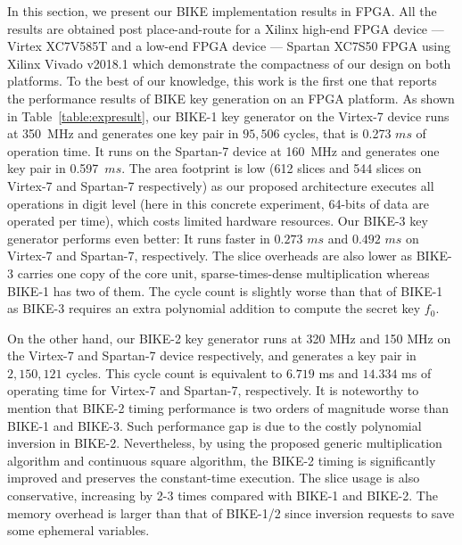 \documentclass[runningheads]{llncs}
\begin{document}
In this section, we present our BIKE implementation results in FPGA. All the results are obtained post place-and-route for a  Xilinx high-end FPGA device --- Virtex XC7V585T  and a low-end FPGA device ---  Spartan XC7S50 FPGA using Xilinx Vivado v2018.1 which demonstrate the compactness of our design on both platforms. To the best of our knowledge, this work is the first one that reports the performance results of BIKE key generation on an FPGA platform. As shown in Table~\ref{table:expresult}, our BIKE-1 key generator on the Virtex-7 device runs at 350~MHz and generates one key pair  in $95,506$ cycles, that is 0.273 $ms$ of operation time. It runs on the Spartan-7 device at 160~MHz and generates one key pair in 0.597~$ms$. The area footprint is low (612 slices and 544 slices on Virtex-7 and Spartan-7 respectively) as our proposed architecture executes all operations  in digit level (here in this concrete experiment, 64-bits of data are operated per time), which costs limited hardware resources. Our BIKE-3 key generator performs even better: It runs faster in $0.273$ $ms$ and $0.492$ $ms$ on Virtex-7 and Spartan-7, respectively. The slice overheads are also lower as BIKE-3 carries one copy of the core unit, sparse-times-dense multiplication whereas BIKE-1 has two of them. The cycle count is slightly worse than that of BIKE-1 as BIKE-3 requires an extra polynomial addition to compute the secret key $f_0$.

On the other hand, our BIKE-2 key generator runs at 320 MHz and 150 MHz on the Virtex-7 and Spartan-7 device respectively, and generates a key pair in $2,150,121$ cycles. This cycle count is equivalent to $6.719$ ms and $14.334$ ms of operating time for Virtex-7 and Spartan-7, respectively. It is noteworthy to mention that BIKE-2 timing performance is  two orders of magnitude worse than BIKE-1 and BIKE-3.  Such performance gap is due to the costly polynomial inversion in BIKE-2. Nevertheless, by using the proposed generic multiplication algorithm and continuous square algorithm, the BIKE-2 timing is significantly improved and preserves the constant-time execution. The slice usage is also conservative, increasing by 2-3 times compared with BIKE-1 and BIKE-2.  The memory overhead is larger than that of BIKE-1/2 since inversion requests to save some ephemeral variables.
\end{document}
